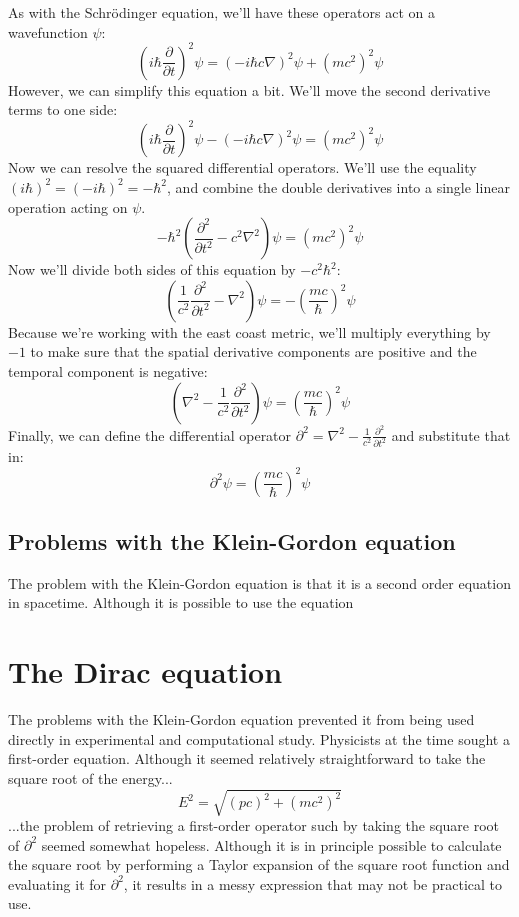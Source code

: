 As with the Schrödinger equation, we'll have these operators act on a wavefunction $\psi$:
$$
\left(i\hbar\frac{\partial}{\partial t}\right)^2 \psi =
\left(-i\hbar c \nabla\right)^2 \psi +
\left(mc^2\right)^2 \psi
$$
However, we can simplify this equation a bit. We'll move the second derivative terms to one side:
$$
\left(i\hbar\frac{\partial}{\partial t}\right)^2 \psi -
\left(-i\hbar c \nabla\right)^2 \psi =
\left(mc^2\right)^2 \psi
$$
Now we can resolve the squared differential operators. We'll use the equality $(i\hbar)^2 =
(-i\hbar)^2 = -\hbar^2$, and combine the double derivatives into a single linear operation acting on
$\psi$.
$$
-\hbar^2 \left(\frac{\partial^2}{\partial t^2} - c^2 \nabla^2\right) \psi = \left(mc^2\right)^2 \psi
$$
Now we'll divide both sides of this equation by $-c^2 \hbar^2$:
$$
\left(\frac{1}{c^2}\frac{\partial^2}{\partial t^2} - \nabla^2\right) \psi =
-\left(\frac{mc}{\hbar}\right)^2 \psi
$$
Because we're working with the east coast metric, we'll multiply everything by $-1$ to make sure
that the spatial derivative components are positive and the temporal component is negative:
$$
\left(\nabla^2 - \frac{1}{c^2}\frac{\partial^2}{\partial t^2}\right) \psi =
\left(\frac{mc}{\hbar}\right)^2 \psi
$$
Finally, we can define the differential operator $\partial^2 = \nabla^2 -
\frac{1}{c^2}\frac{\partial^2}{\partial t^2}$ and substitute that in:
$$
\partial^2 \psi = \left(\frac{mc}{\hbar}\right)^2 \psi
$$

\subsection{Problems with the Klein-Gordon equation}

The problem with the Klein-Gordon equation is that it is a second order equation in spacetime.
Although it is possible to use the equation

\section{The Dirac equation}

The problems with the Klein-Gordon equation prevented it from being used directly in experimental
and computational study. Physicists at the time sought a first-order equation. Although it seemed
relatively straightforward to take the square root of the energy...
$$E^2 = \sqrt{(pc)^2 + (mc^2)^2}$$
...the problem of retrieving a first-order operator such by taking the square root of $\partial^2$
seemed somewhat hopeless. Although it is in principle possible to calculate the square root by
performing a Taylor expansion of the square root function and evaluating it for $\partial^2$, it
results in a messy expression that may not be practical to use.

